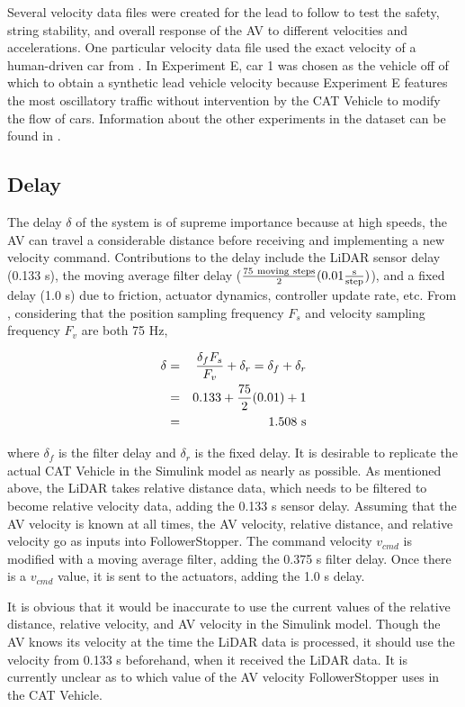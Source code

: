 \documentclass[conference]{IEEEtran}
\begin{document}
Several velocity data files were created for the lead to follow to test the safety, string stability, and overall response of the AV to different velocities and accelerations. One particular velocity data file used the exact velocity of a human-driven car from \cite{wu2018arizona}. In Experiment E, car 1 was chosen as the vehicle off of which to obtain a synthetic lead vehicle velocity because Experiment E features the most oscillatory traffic without intervention by the CAT Vehicle to modify the flow of cars. Information about the other experiments in the dataset can be found in \cite{wu2019tracking}.


\subsection{Delay}
The delay $\delta$ of the system is of supreme importance because at high speeds, the AV can travel a considerable distance before receiving and implementing a new velocity command. Contributions to the delay include the LiDAR sensor delay (0.133 s), the moving average filter delay ($\rm {75\ moving\ steps\over 2}(0.01{s\over step})$), and a fixed delay (1.0 s) due to friction, actuator dynamics, controller update rate, etc. From \cite{bhadani2019real}, considering that the position sampling frequency $F_s$ and velocity sampling frequency $F_v$ are both 75 Hz,

\begin{eqnarray*}
\delta &=& {\delta_f F_s \over F_v}+\delta_r = \delta_f +\delta_r \\
&=& 0.133+{75\over 2}(0.01)+1\\
&=& 1.508 \rm\ s
\end{eqnarray*}

where $\delta_f$ is the filter delay and $\delta_r$ is the fixed delay. It is desirable to replicate the actual CAT Vehicle in the Simulink model as nearly as possible. As mentioned above, the LiDAR takes relative distance data, which needs to be filtered to become relative velocity data, adding the 0.133 s sensor delay. Assuming that the AV velocity is known at all times, the AV velocity, relative distance, and relative velocity go as inputs into FollowerStopper. The command velocity $v_{cmd}$ is modified with a moving average filter, adding the 0.375 s filter delay. Once there is a $v_{cmd}$ value, it is sent to the actuators, adding the 1.0 s delay. 

It is obvious that it would be inaccurate to use the current values of the relative distance, relative velocity, and AV velocity in the Simulink model. Though the AV knows its velocity at the time the LiDAR data is processed, it should use the velocity from 0.133 s beforehand, when it received the LiDAR data. It is currently unclear as to which value of the AV velocity FollowerStopper uses in the CAT Vehicle. 
\end{document}
